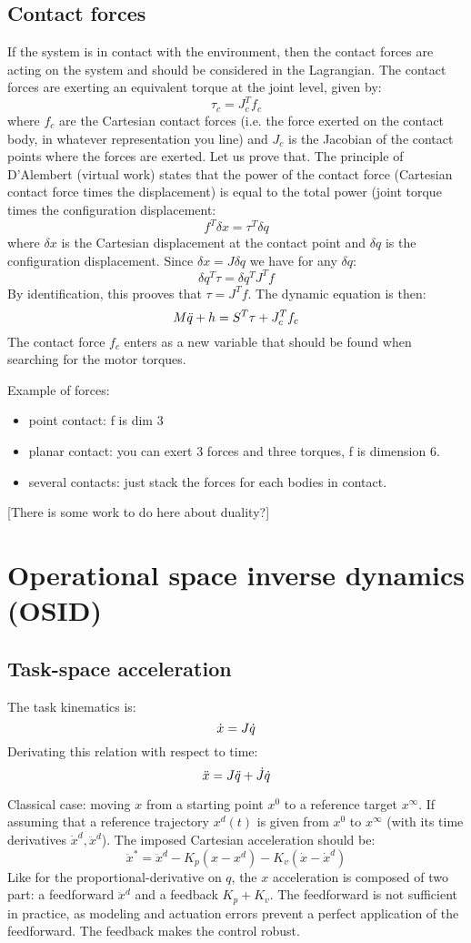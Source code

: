 \documentclass{book}
\begin{document}
\subsection{Contact forces}
If the system is in contact with the environment, then the contact forces are acting on the system and should be considered in the Lagrangian. The contact forces are exerting an equivalent torque at the joint level, given by:
$$ \tau_{c} = J_c^T f_c$$
where $f_c$ are the Cartesian contact forces (i.e. the force exerted on the contact body, in whatever representation you line) and $J_c$ is the Jacobian of the contact points where the forces are exerted. Let us prove that. The principle of D'Alembert (virtual work) states that the power of the contact force (Cartesian contact force times the displacement) is equal to the total power (joint torque times the configuration displacement:
$$f^T \delta x = \tau^T \delta q$$
where $\delta x$ is the Cartesian displacement at the contact point and $\delta q$ is the configuration displacement. Since $\delta x= J \delta q$ we have for any $\delta q$:
$$\delta q^T \tau = \delta q^T J^T f$$
By identification, this prooves that $\tau = J^T f$.
%
The dynamic equation is then:
$$ M \ddot q + h = S^T \tau + J_c^T f_c$$
The contact force $f_c$ enters as a new variable that should be found when searching for the motor torques. 

Example of forces: 
\begin{itemize}
\item point contact: f is dim 3
\item planar contact: you can exert 3 forces and three torques, f is dimension 6.
\item several contacts: just stack the forces for each bodies in contact.
\end{itemize}
[There is some work to do here about duality?]

\section{Operational space inverse dynamics (OSID)}

\subsection{Task-space acceleration}

The task kinematics is:
$$\dot x = J \dot q$$
Derivating this relation with respect to time:
$$ \ddot x = J \ddot q + \dot J \dot q$$

Classical case: moving $x$ from a starting point $x^0$ to a reference target $x^\infty$. If assuming that a reference trajectory $x^d(t)$ is given from $x^0$ to $x^\infty$ (with its time derivatives $\dot x^d, \ddot x^d$). The imposed Cartesian acceleration should be:
$$ \ddot x^* = \ddot x^d - K_p(x-x^d) - K_v (\dot x - \dot x^d) $$
Like for the proportional-derivative on $q$, the $x$ acceleration is composed of two part: a feedforward $\ddot x^d$ and a feedback $K_p+K_v$. The feedforward is not sufficient in practice, as modeling and actuation errors prevent a perfect application of the feedforward. The feedback makes the control robust.
\end{document}
